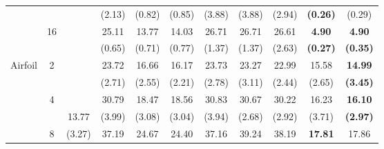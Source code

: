 \documentclass[letterpaper]{article} %
\begin{document}
\begin{table}[!t]
{\begin{tabular}{clcccccccc|cc}
\multicolumn{2}{c}{}                             &                       &                             & (2.13)                    & (0.82)                    & (0.85)                      & (3.88)                    & (3.88)                    & (2.94)                      & \textbf{(0.26)}     & (0.29)                \\
\multicolumn{2}{c}{}                             & \multirow{2}{*}{16}   &                             & 25.11                     & 13.77                     & 14.03                       & 26.71                     & 26.71                     & 26.61                       & \textbf{4.90}       & \textbf{4.90}         \\
\multicolumn{2}{c}{}                             &                       &                             & (0.65)                    & (0.71)                    & (0.77)                      & (1.37)                    & (1.37)                    & (2.63)                      & \textbf{(0.27)}     & \textbf{(0.35)}       \\ \hline
\multicolumn{2}{c}{\multirow{8}{*}{Airfoil}}     & \multirow{2}{*}{2}    &                             & 23.72                     & 16.66                     & 16.17                       & 23.73                     & 23.27                     & 22.99                       & 15.58               & \textbf{14.99}        \\
\multicolumn{2}{c}{}                             &                       &                             & (2.71)                    & (2.55)                    & (2.21)                      & (2.78)                    & (3.11)                    & (2.44)                      & (2.65)              & \textbf{(3.45)}       \\
\multicolumn{2}{c}{}                             & \multirow{2}{*}{4}    &                             & 30.79                     & 18.47                     & 18.56                       & 30.83                     & 30.67                     & 30.22                       & 16.23               & \textbf{16.10}        \\
\multicolumn{2}{c}{}                             &                       & 13.77                       & (3.99)                    & (3.08)                    & (3.04)                      & (3.94)                    & (2.68)                    & (2.92)                      & (3.71)              & \textbf{(2.97)}       \\
\multicolumn{2}{c}{}                             & \multirow{2}{*}{8}    & (3.27)                      & 37.19                     & 24.67                     & 24.40                       & 37.16                     & 39.24                     & 38.19                       & \textbf{17.81}      & 17.86                 \\

\end{tabular}}
\end{table}
\end{document}
